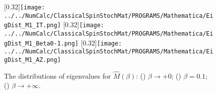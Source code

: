 \begin{figure}[htbp]
	\centering
	
	\subcaptionbox{\label{subcap:EigDistM1IT}}[0.32\linewidth]{\texttt{[image: ../../NumCalc/ClassicalSpinStochMat/PROGRAMS/Mathematica/EigDist\_M1\_IT.png]}}
	\subcaptionbox{\label{subcap:EigDistM1B0-1}}[0.32\linewidth]{\texttt{[image: ../../NumCalc/ClassicalSpinStochMat/PROGRAMS/Mathematica/EigDist\_M1\_Beta0-1.png]}}
	\subcaptionbox{\label{subcap:EigDistM1AZ}}[0.32\linewidth]{\texttt{[image: ../../NumCalc/ClassicalSpinStochMat/PROGRAMS/Mathematica/EigDist\_M1\_AZ.png]}}
	
	\caption{The distributions of eigenvalues for $\hat{M}(\beta)$: () $\beta\to+0$; () $\beta=0.1$; () $\beta\to+\infty$.}\label{fig:EigDistMbeta}
\end{figure}